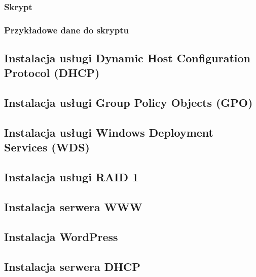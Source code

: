 \subsubsection{Skrypt}
\clearpage
\subsubsection{Przykładowe dane do skryptu}
\clearpage

\subsection{Instalacja usługi Dynamic Host Configuration Protocol (DHCP)}

\subsection{Instalacja usługi Group Policy Objects (GPO)}

\subsection{Instalacja usługi Windows Deployment Services (WDS)}

\subsection{Instalacja usługi RAID 1}

\subsection{Instalacja serwera WWW}

\subsection{Instalacja WordPress}

\subsection{Instalacja serwera DHCP}

